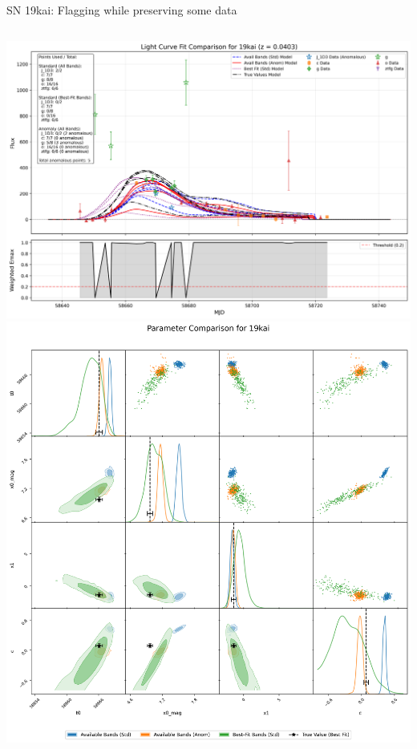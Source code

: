 \documentclass[aspectratio=169]{beamer}
\begin{document}
\begin{frame}{SN 19kai: Flagging while preserving some data}
  \begin{columns}
    \includegraphics[width=\textwidth]{images/light_curve_comparison_19kai.png}
    \includegraphics[width=\textwidth]{images/corner_comparison_19kai.png}
  \end{columns}
\end{frame}
\end{document}
